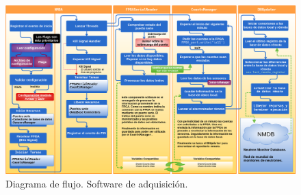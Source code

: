 \begin{figure}
	\centering
	\includegraphics[keepaspectratio, width=1\textwidth]{./img/soft_adquisicion.png}
	\caption{Diagrama de flujo. Software de adquisición.}
	\label{fig:soft_adquisición}
\end{figure}

